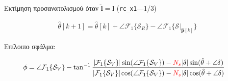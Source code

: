 \begin{frame}{Εκτίμηση προσανατολισμού όταν $\hat{\bm{l}} = \bm{l}$ (\texttt{rc\_x1}---1/3)}


  \begin{align}
    \hat{\theta}[k+1] = \hat{\theta}[k] + \angle \mathcal{F}_1\{\mathcal{S}_R\} - \angle\mathcal{F}_1\{\mathcal{S}|_{\bm{\hat{p}}[k]}\} \nonumber
  \end{align}

  Επίλοιπο σφάλμα:

  \begin{align}
    \phi &= \angle \mathcal{F}_1\{\mathcal{S}_V\} - \tan^{-1}\dfrac{|\mathcal{F}_1\{\mathcal{S}_V\}| \sin(\angle \mathcal{F}_1\{\mathcal{S}_V\})-\textcolor{r}{N_s} |\delta| \sin(\hat{\theta} + \angle \delta)}
                                                                 {|\mathcal{F}_1\{\mathcal{S}_V\}| \cos(\angle \mathcal{F}_1\{\mathcal{S}_V\})-\textcolor{r}{N_s} |\delta| \cos(\hat{\theta} + \angle \delta)} \nonumber
  \end{align}

\end{frame}
